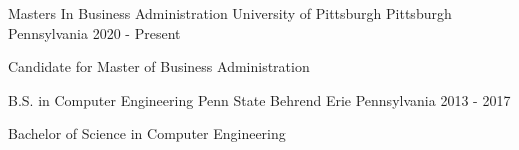 


\begin{cventries}

\cventry
{Masters In Business Administration} %
{University of Pittsburgh} %
{Pittsburgh Pennsylvania} %
{2020 - Present} %
{ %
\begin{cvitems}
\item 
{
    Candidate for Master of Business Administration 
}
\end{cvitems}
}

\cventry
{B.S. in Computer Engineering} %
{Penn State Behrend} %
{Erie Pennsylvania} %
{2013 - 2017} %
{ %
\begin{cvitems}
\item 
{
    Bachelor of Science in Computer Engineering
}
\end{cvitems}
}


\end{cventries}